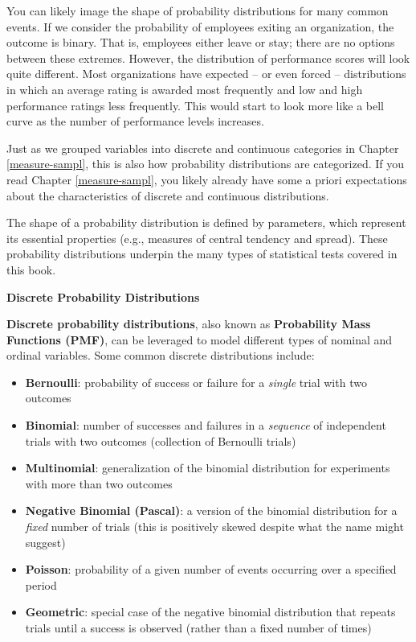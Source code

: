 \documentclass[]{book}
\providecommand{\tightlist}{%
  \setlength{\itemsep}{0pt}\setlength{\parskip}{0pt}}
\begin{document}
You can likely image the shape of probability distributions for many common events. If we consider the probability of employees exiting an organization, the outcome is binary. That is, employees either leave or stay; there are no options between these extremes. However, the distribution of performance scores will look quite different. Most organizations have expected -- or even forced -- distributions in which an average rating is awarded most frequently and low and high performance ratings less frequently. This would start to look more like a bell curve as the number of performance levels increases.

Just as we grouped variables into discrete and continuous categories in Chapter \ref{measure-sampl}, this is also how probability distributions are categorized. If you read Chapter \ref{measure-sampl}, you likely already have some a priori expectations about the characteristics of discrete and continuous distributions.

The shape of a probability distribution is defined by parameters, which represent its essential properties (e.g., measures of central tendency and spread). These probability distributions underpin the many types of statistical tests covered in this book.

\textbf{Discrete Probability Distributions}

\textbf{Discrete probability distributions}, also known as \textbf{Probability Mass Functions (PMF)}, can be leveraged to model different types of nominal and ordinal variables. Some common discrete distributions include:

\begin{itemize}
\tightlist
\item
  \textbf{Bernoulli}: probability of success or failure for a \emph{single} trial with two outcomes
\item
  \textbf{Binomial}: number of successes and failures in a \emph{sequence} of independent trials with two outcomes (collection of Bernoulli trials)
\item
  \textbf{Multinomial}: generalization of the binomial distribution for experiments with more than two outcomes
\item
  \textbf{Negative Binomial (Pascal)}: a version of the binomial distribution for a \emph{fixed} number of trials (this is positively skewed despite what the name might suggest)
\item
  \textbf{Poisson}: probability of a given number of events occurring over a specified period
\item
  \textbf{Geometric}: special case of the negative binomial distribution that repeats trials until a success is observed (rather than a fixed number of times)
\end{itemize}
\end{document}
